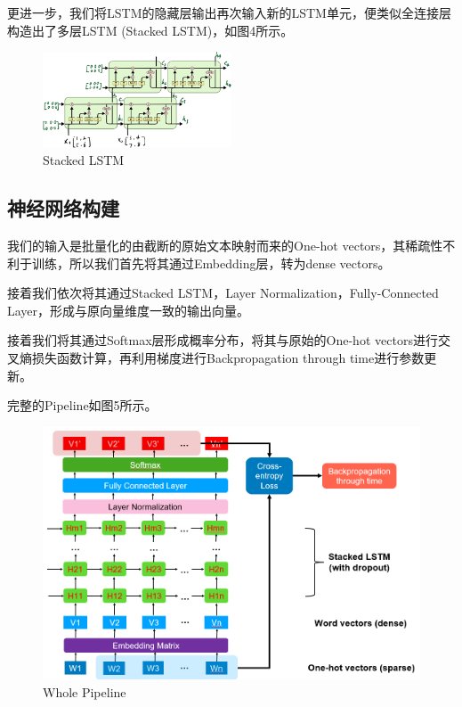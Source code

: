 \documentclass[12pt,a4paper]{article}
\begin{document}
    更进一步，我们将LSTM的隐藏层输出再次输入新的LSTM单元，便类似全连接层构造出了多层LSTM (Stacked LSTM)，如图4所示。

    \begin{figure}[!h]
        \centering
        \includegraphics[width=0.5\textwidth]{图片1.png}
        \caption{Stacked LSTM}
    \end{figure}


\subsection{神经网络构建}
    我们的输入是批量化的由截断的原始文本映射而来的One-hot vectors，其稀疏性不利于训练，所以我们首先将其通过Embedding层，转为dense vectors。
    
    接着我们依次将其通过Stacked LSTM，Layer Normalization，Fully-Connected Layer，形成与原向量维度一致的输出向量。
    
    接着我们将其通过Softmax层形成概率分布，将其与原始的One-hot vectors进行交叉熵损失函数计算，再利用梯度进行Backpropagation through time进行参数更新。
    
    完整的Pipeline如图5所示。
\begin{figure}[!h]
    \centering
    \includegraphics[width=1\textwidth]{图片3.png}
    \caption{Whole Pipeline}
\end{figure}
\end{document}
